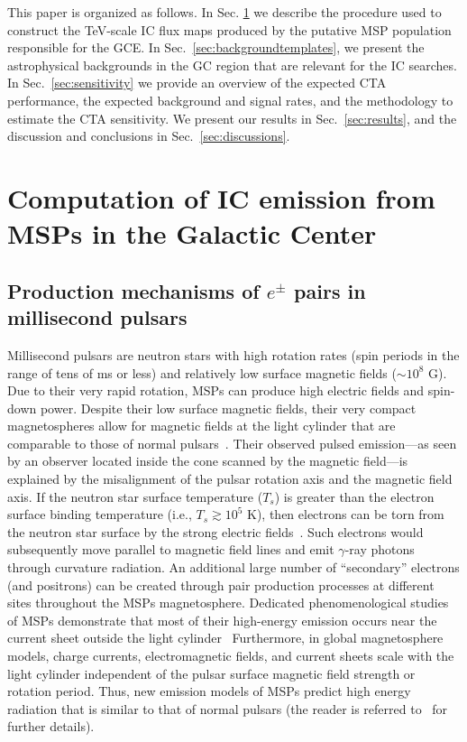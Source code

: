 \documentclass[doublespace,draft,nopageskip]{VTthesis} %
\begin{document}
This paper is organized as follows. In Sec. \ref{sec:ICfromMSPs} we describe the procedure used to construct the TeV-scale IC flux maps produced by the putative MSP population responsible for the GCE. In Sec.~\ref{sec:backgroundtemplates}, we present the astrophysical backgrounds in the GC region that are relevant for the IC searches. In Sec.~\ref{sec:sensitivity} we provide an overview of the expected CTA performance, the expected background and signal rates, and the methodology to estimate the CTA sensitivity. We present our results in Sec.~\ref{sec:results}, and the discussion and conclusions in Sec.~\ref{sec:discussions}. 
 
 

\section{Computation of IC emission from MSPs in the Galactic Center}
\label{sec:ICfromMSPs}


\subsection{Production mechanisms of $e^{\pm}$ pairs in millisecond pulsars}
\label{subsec:e+-injection}

Millisecond pulsars are neutron stars with high rotation rates (spin periods in the range of tens of ms or less) and relatively low surface magnetic fields ($\sim 10^{8}$ G). Due to their very rapid rotation, MSPs can produce high  
electric fields and spin-down power. Despite their low surface magnetic fields, their very compact magnetospheres allow for 
magnetic fields at the light cylinder that are comparable to those of normal pulsars~\citep{Harding:2021yuv}. Their observed pulsed emission---as seen by an observer located inside the cone scanned by the magnetic field---is explained by the misalignment of the pulsar rotation axis and the magnetic field axis.  If the neutron star surface temperature ($T_s$) is greater than the electron surface binding temperature (i.e., $T_s\gtrsim 10^5$ K), then electrons can be torn from the neutron star surface by the strong electric fields~\citep{Michel:1991}. Such electrons would subsequently move parallel to magnetic field lines and emit $\gamma$-ray photons through curvature radiation. An additional large number of ``secondary'' electrons (and positrons) can be created through pair production processes at different sites throughout the MSPs magnetosphere. 
Dedicated phenomenological studies of MSPs demonstrate that most of their high-energy emission occurs near the current sheet outside the light cylinder~\citep{Fermi-LAT:4FGL,Harding:2021yuv}
Furthermore, in global magnetosphere models, charge currents, electromagnetic fields, and current sheets scale with the light cylinder independent of the pulsar surface magnetic field strength or rotation period. Thus, new emission models of MSPs predict high energy radiation that is similar to that of normal pulsars (the reader is referred to~\citealt{Harding:2021yuv} for further details).
\end{document}
